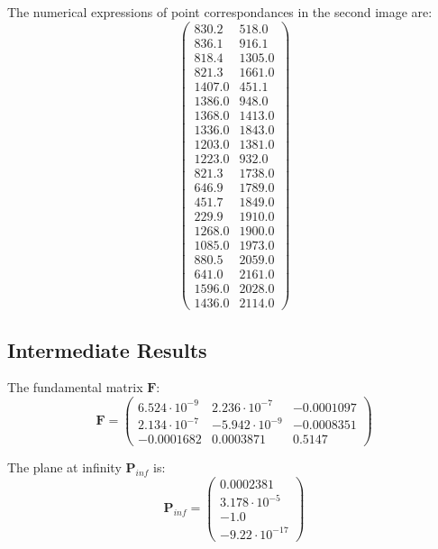 \documentclass[conference]{IEEEtran}
\newcommand{\mat}[1]{\mathbf{#1}} %
\begin{document}
The numerical expressions of point correspondances in the second image are:
\begin{equation}
	\left(\begin{array}{cc} 830.2 & 518.0\\ 836.1 & 916.1\\ 818.4 & 1305.0\\ 821.3 & 1661.0\\ 1407.0 & 451.1\\ 1386.0 & 948.0\\ 1368.0 & 1413.0\\ 1336.0 & 1843.0\\ 1203.0 & 1381.0\\ 1223.0 & 932.0\\ 821.3 & 1738.0\\ 646.9 & 1789.0\\ 451.7 & 1849.0\\ 229.9 & 1910.0\\ 1268.0 & 1900.0\\ 1085.0 & 1973.0\\ 880.5 & 2059.0\\ 641.0 & 2161.0\\ 1596.0 & 2028.0\\ 1436.0 & 2114.0 \end{array}\right)
\end{equation}

\subsection{Intermediate Results}
The fundamental matrix $\mat{F}$:
\begin{equation}
	\mat{F} = \left(\begin{array}{ccc} 6.524\cdot 10^{-9} & 2.236\cdot 10^{-7} & -0.0001097\\ 2.134\cdot 10^{-7} & -5.942\cdot 10^{-9} & -0.0008351\\ -0.0001682 & 0.0003871 & 0.5147 \end{array}\right)
\end{equation}

The plane at infinity $\mat{P}_{inf}$ is:
\begin{equation}
	\mat{P}_{inf} = \left(\begin{array}{c} 0.0002381\\ 3.178\cdot 10^{-5}\\ -1.0\\ -9.22\cdot 10^{-17} \end{array}\right)
\end{equation}
\end{document}
